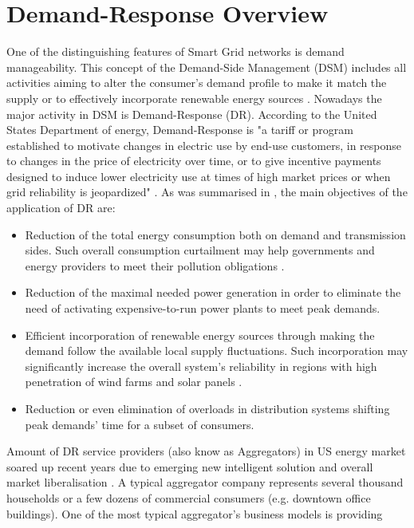 \section{Demand-Response Overview}


One of the distinguishing features of Smart Grid networks is demand manageability. This concept of the Demand-Side Management (DSM) includes all activities aiming to alter the consumer's demand profile to make it match the supply or to effectively incorporate renewable energy sources \cite{Alizadeh2012}. Nowadays the major activity in DSM is Demand-Response (DR)\cite{Palensky2011}. According to the United States Department of energy, Demand-Response is "a tariff or program established to motivate changes in electric use by end-use customers, in response to changes in the price of electricity over time, or to give incentive payments designed to induce lower electricity use at times of high market prices or when grid reliability is jeopardized" \cite{DepartmentofEnergyUSA2006}. As was summarised in \cite{Vardakas2015}, the main objectives of the application of DR are:
\begin{itemize}
    \item Reduction of the total energy consumption both on demand and transmission sides. Such overall consumption curtailment may help governments and energy providers to meet their pollution obligations \cite{DepartmentofEnergyUSA2006, Shishlov2016, UnitedNations/FrameworkConventiononClimateChange2015}.
    \item Reduction of the maximal needed power generation in order to eliminate the need of activating expensive-to-run power plants to meet peak demands. 
    \item Efficient incorporation of renewable energy sources through making the demand follow the available local supply fluctuations. Such incorporation may significantly increase the overall system's reliability in regions with high penetration of wind farms and solar panels \cite{Santacana2010}. 
    \item Reduction or even elimination of overloads in distribution systems shifting peak demands' time for a subset of consumers.
\end{itemize} 

Amount of DR service providers (also know as Aggregators) in US energy market soared up recent years due to emerging new intelligent solution and overall market liberalisation  . A typical aggregator company represents several thousand households or a few dozens of commercial consumers (e.g. downtown office buildings).  One of the most typical aggregator's business models is providing   

